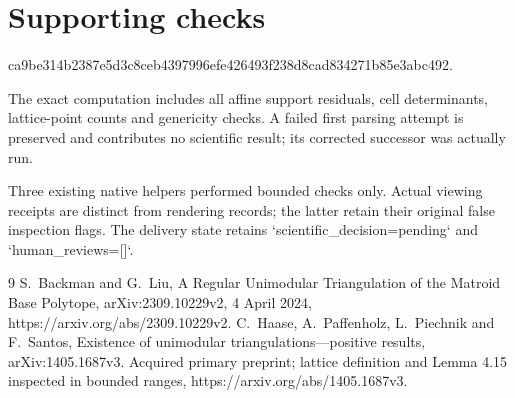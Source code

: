 \documentclass[10pt]{article}
\begin{document}
\section*{Supporting checks}
ca9be314b2387e5d3c8ceb4397996efe426493f238d8cad834271b85e3abc492.\par
The exact computation includes all affine support residuals, cell determinants, lattice-point counts and genericity checks. A failed first parsing attempt is preserved and contributes no scientific result; its corrected successor was actually run.\par
Three existing native helpers performed bounded checks only. Actual viewing receipts are distinct from rendering records; the latter retain their original false inspection flags. The delivery state retains `scientific\_decision=pending` and `human\_reviews=[]`.\par
9 S. Backman and G. Liu, A Regular Unimodular Triangulation of the Matroid Base Polytope, arXiv:2309.10229v2, 4 April 2024, https://arxiv.org/abs/2309.10229v2. C. Haase, A. Paffenholz, L. Piechnik and F. Santos, Existence of unimodular triangulations—positive results, arXiv:1405.1687v3. Acquired primary preprint; lattice definition and Lemma 4.15 inspected in bounded ranges, https://arxiv.org/abs/1405.1687v3.\par
\end{document}
